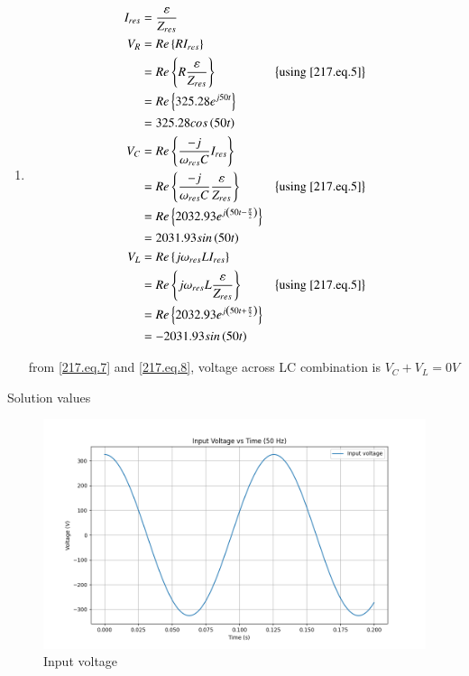 \documentclass[journal,12pt,twocolumn]{IEEEtran}
\begin{document}
\begin{enumerate}
\item 
\begin{align}
    I_{res} & = \frac{\varepsilon}{Z_{res}}\label{217.eq.5}\\
    V_R & = Re\left\{RI_{res}\right\}\\
    & = Re\left\{R\frac{\varepsilon}{Z_{res}}\right\}&\left\{\text{using \eqref{217.eq.5}}\right\}\\
    & = Re\left\{325.28e^{j50t}\right\}\\
    & = 325.28 cos\left(50t\right)\\
    V_C & = Re\left\{\frac{-j}{\omega_{res}C}I_{res}\right\}\\
    & = Re\left\{\frac{-j}{\omega_{res}C}\frac{\varepsilon}{Z_{res}}\right\}&\left\{\text{using \eqref{217.eq.5}}\right\}\\
    & = Re\left\{2032.93 e^{j\left(50t - \frac{\pi}{2}\right)}\right\}\\
    & = 2031.93 sin\left(50t\right) \label{217.eq.7}\\
    V_L& = Re\left\{j\omega_{res}LI_{res}\right\}\\
    & = Re\left\{j\omega_{res}L\frac{\varepsilon}{Z_{res}}\right\}&\left\{\text{using \eqref{217.eq.5}}\right\}\\
    & = Re\left\{2032.93e^{j\left(50t + \frac{\pi}{2}\right)}\right\}\\
    & = - 2031.93 sin\left(50t\right) \label{217.eq.8}
\end{align}

from \eqref{217.eq.7} and \eqref{217.eq.8}, voltage across LC combination is $V_C + V_L = 0 V$
\end{enumerate}

\begin{table}[h]
    \centering
    
    \caption{Solution values}
    \label{tab:217.tab.2}
\end{table}

\begin{figure}[h]
     \centering
	\includegraphics[width=\columnwidth]{figs/Vin.png}
     \caption{Input voltage}
     \label{217.fig.5}
\end{figure}
\end{document}
